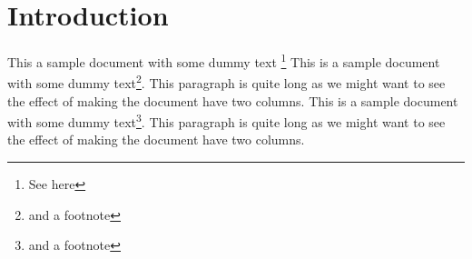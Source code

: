 \documentclass[headings=big]{scrreprt}
\begin{document}
\chapter{Introduction}
This a sample document with some dummy text \footnote{See here}
This is a sample document with some dummy
text\footnote{and a footnote}. This paragraph is quite
long as we might want to see the effect of making the
document have two columns.
This is a sample document with some dummy
text\footnote{and a footnote}. This paragraph is quite
long as we might want to see the effect of making the
document have two columns.
\end{document}
